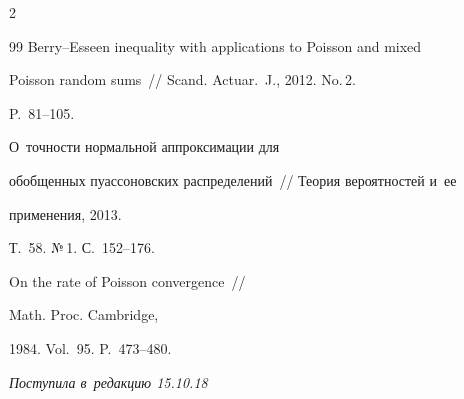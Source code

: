 \begin{multicols}{2}
{{\begin{thebibliography}{99}
Berry--Esseen inequality with applications to Poisson and mixed


Poisson random sums~// Scand. Actuar.~J., 2012. No.\,2.


P.~81--105.







 О~точ\-ности нормальной аппроксимации для


обобщенных пуассоновских распределений~// Теория вероятностей и~ее


применения, 2013.


Т.~58. №\,1. С.~152--176.







 On the rate of Poisson convergence~// 


Math. Proc. Cambridge,


1984. Vol.~95. P.~473--480.


 \end{thebibliography}





 }


 }





\end{multicols}





\vspace*{-3pt}





\hfill{\small\textit{Поступила в~редакцию 15.10.18}}





\vspace*{8pt}




















